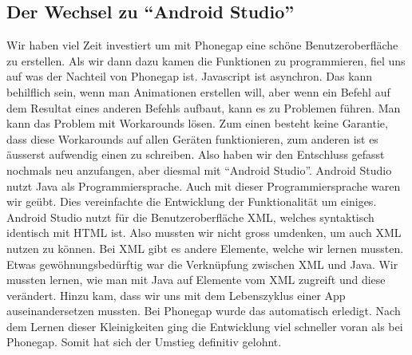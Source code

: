 \subsection{Der Wechsel zu "`Android Studio"'}
Wir haben viel Zeit investiert um mit Phonegap eine schöne Benutzeroberfläche zu erstellen. Als wir dann dazu kamen die Funktionen zu programmieren, fiel uns auf was der Nachteil von Phonegap ist. Javascript ist asynchron. Das kann behilflich sein, wenn man Animationen erstellen will, aber wenn ein Befehl auf dem Resultat eines anderen Befehls aufbaut, kann es zu Problemen führen. Man kann das Problem mit Workarounds lösen. Zum einen besteht keine Garantie, dass diese Workarounds auf allen Geräten funktionieren, zum anderen ist es äusserst aufwendig einen zu schreiben. Also haben wir den Entschluss gefasst nochmals neu anzufangen, aber diesmal mit "`Android Studio"'. Android Studio nutzt Java als Programmiersprache. Auch mit dieser Programmiersprache waren wir geübt. Dies vereinfachte die Entwicklung der Funktionalität um einiges. Android Studio nutzt für die Benutzeroberfläche XML, welches syntaktisch identisch mit HTML ist. Also mussten wir nicht gross umdenken, um auch XML nutzen zu können. Bei XML gibt es andere Elemente, welche wir lernen mussten. Etwas gewöhnungsbedürftig war die Verknüpfung zwischen XML und Java. Wir mussten lernen, wie man mit Java auf Elemente vom XML zugreift und diese verändert. Hinzu kam, dass wir uns mit dem Lebenszyklus einer App auseinandersetzen mussten. Bei Phonegap wurde das automatisch erledigt. Nach dem Lernen dieser Kleinigkeiten ging die Entwicklung viel schneller voran als bei Phonegap. Somit hat sich der Umstieg definitiv gelohnt.
